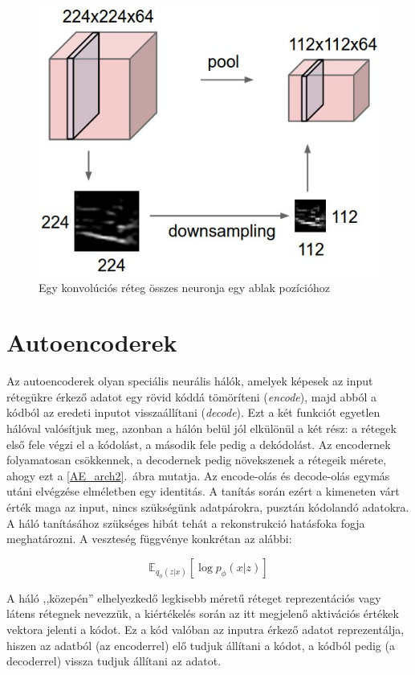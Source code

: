 \begin{figure}[h!]
\begin{center}
  
	\begin{center}
	\includegraphics[width=0.5\linewidth]{pool.jpeg}
	\end{center}
	
  \caption{Egy konvolúciós réteg összes neuronja egy ablak pozícióhoz}\label{pool}
\end{center}
\end{figure}

\section{Autoencoderek}

Az autoencoderek olyan speciális neurális hálók, amelyek képesek az input rétegükre érkező adatot egy rövid kóddá tömöríteni (\emph{encode}), majd abból a kódból az eredeti inputot visszaállítani (\emph{decode}). Ezt a két funkciót egyetlen hálóval valósítjuk meg, azonban a hálón belül jól elkülönül a két rész: a rétegek első fele végzi el a kódolást, a második fele pedig a dekódolást. Az encodernek folyamatosan csökkennek, a decodernek pedig növekszenek a rétegeik mérete, ahogy ezt a \ref{AE_arch2}.~ábra mutatja. Az encode-olás és decode-olás egymás utáni elvégzése elméletben egy identitás. A tanítás során ezért a kimeneten várt érték maga az input, nincs szükségünk adatpárokra, pusztán kódolandó adatokra. A háló tanításához szükséges hibát tehát a rekonstrukció hatásfoka fogja meghatározni. A veszteség függvénye konkrétan az alábbi:

$$ \mathbb{E}_{q_\phi(z|x)} [\log p_\phi(x|z)]$$

A háló ,,közepén'' elhelyezkedő legkisebb méretű réteget reprezentációs vagy látens rétegnek nevezzük, a kiértékelés során az itt megjelenő aktivációs értékek vektora jelenti a kódot. Ez a kód valóban az inputra érkező adatot reprezentálja, hiszen az adatból (az encoderrel) elő tudjuk állítani a kódot, a kódból pedig (a decoderrel) vissza tudjuk állítani az adatot.

